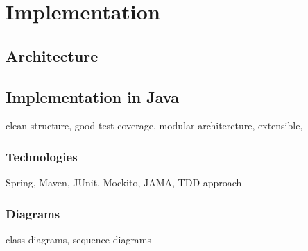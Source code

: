 

\chapter{Implementation}
\label{Implementation}

\section{Architecture}

\section{Implementation in Java}
clean structure, good test coverage, 
modular architercture, extensible,

\subsection{Technologies}
Spring, Maven, JUnit, Mockito, JAMA, TDD approach

\subsection{Diagrams}
class diagrams, sequence diagrams


